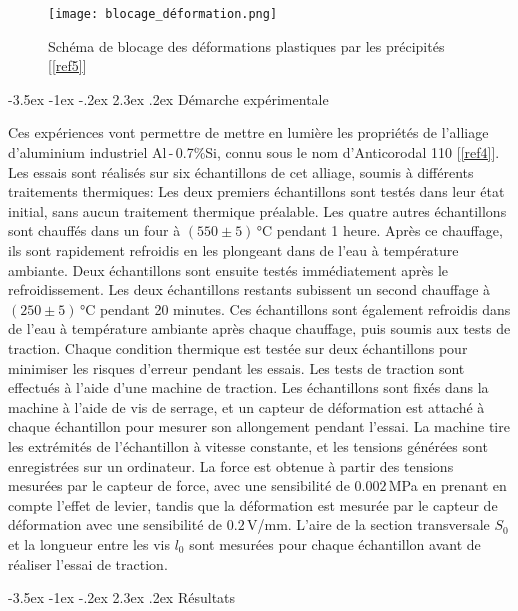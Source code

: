 \documentclass[a4paper, 12pt,oneside]{article}
\makeatletter
\renewcommand{\section}{\@startsection {section}{1}{\z@}%
             {-3.5ex \@plus -1ex \@minus -.2ex}%
             {2.3ex \@plus.2ex}%
             {\normalfont\normalsize\bfseries}}
\makeatother
\begin{document}
\begin{figure}[H]
    \centering
    \texttt{[image: blocage\_déformation.png]}
    \captionsetup{justification=centering}
    \caption{Schéma de blocage des déformations plastiques par les précipités [\ref{ref5}]}
    \label{fig3}
\end{figure}

\section{Démarche expérimentale}

Ces expériences vont permettre de mettre en lumière les propriétés de l'alliage d'aluminium industriel Al\,-\,0.7\%Si, connu sous le nom d'Anticorodal 110 [\ref{ref4}]. Les essais sont réalisés sur six échantillons de cet alliage, soumis à différents traitements thermiques: Les deux premiers échantillons sont testés dans leur état initial, sans aucun traitement thermique préalable. Les quatre autres échantillons sont chauffés dans un four à $(550 \pm 5)$\,°C pendant 1 heure. Après ce chauffage, ils sont rapidement refroidis en les plongeant dans de l'eau à température ambiante. Deux échantillons sont ensuite testés immédiatement après le refroidissement. Les deux échantillons restants subissent un second chauffage à $(250 \pm 5)$\,°C pendant 20 minutes. Ces échantillons sont également refroidis dans de l'eau à température ambiante après chaque chauffage, puis soumis aux tests de traction. Chaque condition thermique est testée sur deux échantillons pour minimiser les risques d’erreur pendant les essais.
Les tests de traction sont effectués à l’aide d’une machine de traction. Les échantillons sont fixés dans la machine à l’aide de vis de serrage, et un capteur de déformation est attaché à chaque échantillon pour mesurer son allongement pendant l’essai. La machine tire les extrémités de l’échantillon à vitesse constante, et les tensions générées sont enregistrées sur un ordinateur. La force est obtenue à partir des tensions mesurées par le capteur de force, avec une sensibilité de $0.002$\,MPa en prenant en compte l'effet de levier, tandis que la déformation est mesurée par le capteur de déformation avec une sensibilité de $0.2$\,V/mm. L'aire de la section transversale $S_0$ et la longueur entre les vis $l_0$ sont mesurées pour chaque échantillon avant de réaliser l'essai de traction.

\section{Résultats}
\end{document}
